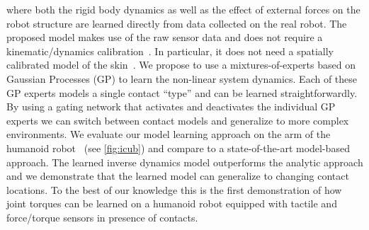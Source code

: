 where both the rigid body dynamics as well as the effect of external forces on the
robot structure are learned directly from data collected on the real robot.
%
The proposed model makes use of the raw sensor data and does not require a kinematic/dynamics calibration~\cite{Yamane2011calibration,Ogawa2014,traversaro2013inertial}. 
In particular, it does not need a spatially calibrated model of the skin~\cite{DelPrete2011}.
%
We propose to use a mixtures-of-experts based on Gaussian Processes (GP) to learn the non-linear system dynamics.
Each of these GP experts models a single contact ``type'' and can be learned straightforwardly.
By using a gating network that activates and deactivates the individual GP experts we can switch between contact models and generalize to more complex environments.
We evaluate our model learning approach on the arm of the \robot{} humanoid robot~\cite{Natale2013} (see \fig\ref{fig:icub}) and compare to a state-of-the-art model-based approach.
The learned inverse dynamics model outperforms the analytic approach and we demonstrate that the learned model can generalize to changing contact locations.
To the best of our knowledge this is the first demonstration of how joint torques can be learned on a humanoid robot equipped with tactile and force/torque sensors in presence of contacts.




